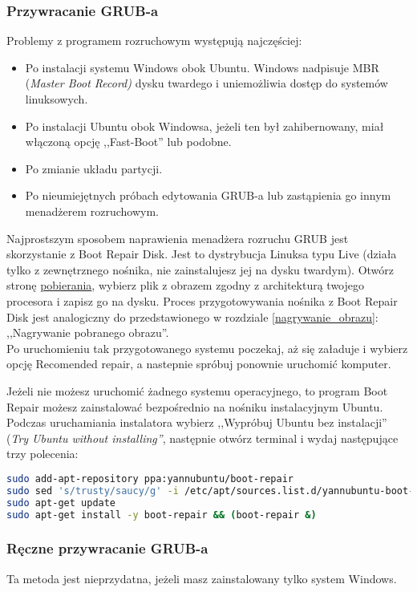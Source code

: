 \subsubsection{Przywracanie GRUB-a}
\label{grub_przywracanie}
Problemy z programem rozruchowym występują najczęściej:
\begin{itemize}
\item Po instalacji systemu Windows obok Ubuntu. Windows nadpisuje MBR (\textit{Master Boot Record)} dysku twardego i uniemożliwia dostęp do systemów linuksowych.
\item Po instalacji Ubuntu obok Windowsa, jeżeli ten był zahibernowany, miał włączoną opcję ,,Fast-Boot'' lub podobne.
\item Po zmianie układu partycji.
\item Po nieumiejętnych próbach edytowania GRUB-a lub zastąpienia go innym menadżerem rozruchowym.
\end{itemize}

Najprostszym sposobem naprawienia menadżera rozruchu GRUB jest skorzystanie z Boot Repair Disk. Jest to dystrybucja Linuksa typu Live (działa tylko z zewnętrznego nośnika, nie zainstalujesz jej na dysku twardym). Otwórz stronę \href{http://sourceforge.net/projects/boot-repair-cd/files/}{pobierania}, wybierz plik z obrazem zgodny z architekturą twojego procesora i zapisz go na dysku. Proces przygotowywania nośnika z Boot Repair Disk jest analogiczny do przedstawionego w rozdziale \ref{nagrywanie_obrazu}: ,,Nagrywanie pobranego obrazu''.\\
Po uruchomieniu tak przygotowanego systemu poczekaj, aż się załaduje i wybierz opcję \textcolor{ubuntu_orange}{Recomended repair}, a nastepnie spróbuj ponownie uruchomić komputer.

Jeżeli nie możesz uruchomić żadnego systemu operacyjnego, to program Boot Repair możesz zainstalować bezpośrednio na nośniku instalacyjnym Ubuntu. Podczas uruchamiania instalatora wybierz ,,Wypróbuj Ubuntu bez instalacji'' (\textit{Try Ubuntu without installing''}, następnie otwórz terminal  i wydaj następujące trzy polecenia:

\begin{lstlisting}[language=bash]
sudo add-apt-repository ppa:yannubuntu/boot-repair
sudo sed 's/trusty/saucy/g' -i /etc/apt/sources.list.d/yannubuntu-boot-repair-trusty.list
sudo apt-get update
sudo apt-get install -y boot-repair && (boot-repair &)
\end{lstlisting}

\subsubsection{Ręczne przywracanie GRUB-a}
Ta metoda jest nieprzydatna, jeżeli masz zainstalowany tylko system Windows.

